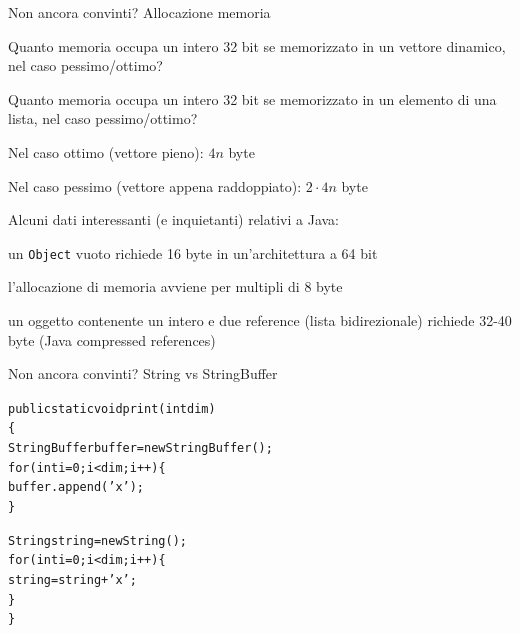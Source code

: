 \begin{frame}{Non ancora convinti? Allocazione memoria}

\vspace{-9pt}
\begin{myboxtitle}[Domande]
\BI
\item Quanto memoria occupa un intero 32 bit se memorizzato in un \alert{vettore dinamico}, nel caso pessimo/ottimo?
\item Quanto memoria occupa un intero 32 bit se memorizzato in un \alert{elemento di una lista}, nel caso pessimo/ottimo? 
\EI
\end{myboxtitle}

\begin{overprint}
\begin{myboxtitle}[Vettori]
\BIL
\item Nel caso ottimo (vettore pieno): \alert{$4n$ byte}
\item Nel caso pessimo (vettore appena raddoppiato): \alert{$2 \cdot 4n$ byte}
\EIL
\end{myboxtitle}
\begin{myboxtitle}[Liste]
Alcuni dati interessanti (e inquietanti) relativi a Java:
\BIL
\item un \texttt{Object} vuoto richiede 16 byte in un'architettura a 64 bit
\item l'allocazione di memoria avviene per multipli di 8 byte
\item un oggetto contenente un intero e due reference (lista bidirezionale) richiede 32-40 byte
(Java compressed references)
\EIL
\end{myboxtitle}
\end{overprint}

\end{frame}

\begin{frame}{Non ancora convinti? String vs StringBuffer}

\begin{alltt}
public static void print(int dim)
\{
  StringBuffer buffer = new \alert{StringBuffer}();
  for (int i=0; i < dim; i++) \{
    \alert{buffer.append('x')};	
  \}

  String string = new \alert{String}();
  for (int i=0; i < dim; i++) \{
    \alert{string = string + 'x'};	
  \} 
\}
\end{alltt}

\end{frame}

